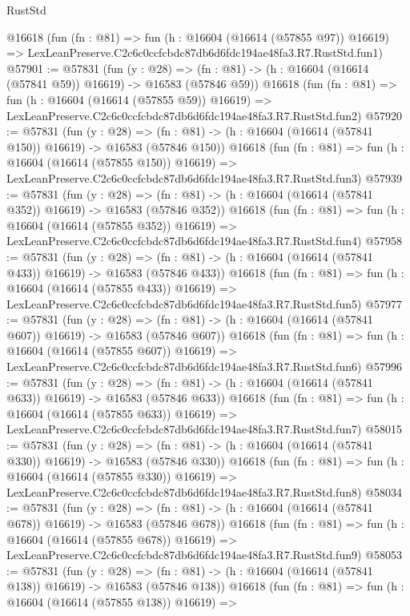 \begin{lexlean}{RustStd}
\begin{coremodule}
    @16618
    (fun (fn : @81) =>
    fun (h : @16604 (@16614 (@57855 @97)) @16619) =>
    LexLeanPreserve.C2c6c0ccfcbdc87db6d6fdc194ae48fa3.R7.RustStd.fun1)
@57901 := @57831
    (fun (y : @28) =>
    (fn : @81) -> (h : @16604 (@16614 (@57841 @59)) @16619) -> @16583 (@57846 @59))
    @16618
    (fun (fn : @81) =>
    fun (h : @16604 (@16614 (@57855 @59)) @16619) =>
    LexLeanPreserve.C2c6c0ccfcbdc87db6d6fdc194ae48fa3.R7.RustStd.fun2)
@57920 := @57831
    (fun (y : @28) =>
    (fn : @81) -> (h : @16604 (@16614 (@57841 @150)) @16619) -> @16583 (@57846 @150))
    @16618
    (fun (fn : @81) =>
    fun (h : @16604 (@16614 (@57855 @150)) @16619) =>
    LexLeanPreserve.C2c6c0ccfcbdc87db6d6fdc194ae48fa3.R7.RustStd.fun3)
@57939 := @57831
    (fun (y : @28) =>
    (fn : @81) -> (h : @16604 (@16614 (@57841 @352)) @16619) -> @16583 (@57846 @352))
    @16618
    (fun (fn : @81) =>
    fun (h : @16604 (@16614 (@57855 @352)) @16619) =>
    LexLeanPreserve.C2c6c0ccfcbdc87db6d6fdc194ae48fa3.R7.RustStd.fun4)
@57958 := @57831
    (fun (y : @28) =>
    (fn : @81) -> (h : @16604 (@16614 (@57841 @433)) @16619) -> @16583 (@57846 @433))
    @16618
    (fun (fn : @81) =>
    fun (h : @16604 (@16614 (@57855 @433)) @16619) =>
    LexLeanPreserve.C2c6c0ccfcbdc87db6d6fdc194ae48fa3.R7.RustStd.fun5)
@57977 := @57831
    (fun (y : @28) =>
    (fn : @81) -> (h : @16604 (@16614 (@57841 @607)) @16619) -> @16583 (@57846 @607))
    @16618
    (fun (fn : @81) =>
    fun (h : @16604 (@16614 (@57855 @607)) @16619) =>
    LexLeanPreserve.C2c6c0ccfcbdc87db6d6fdc194ae48fa3.R7.RustStd.fun6)
@57996 := @57831
    (fun (y : @28) =>
    (fn : @81) -> (h : @16604 (@16614 (@57841 @633)) @16619) -> @16583 (@57846 @633))
    @16618
    (fun (fn : @81) =>
    fun (h : @16604 (@16614 (@57855 @633)) @16619) =>
    LexLeanPreserve.C2c6c0ccfcbdc87db6d6fdc194ae48fa3.R7.RustStd.fun7)
@58015 := @57831
    (fun (y : @28) =>
    (fn : @81) -> (h : @16604 (@16614 (@57841 @330)) @16619) -> @16583 (@57846 @330))
    @16618
    (fun (fn : @81) =>
    fun (h : @16604 (@16614 (@57855 @330)) @16619) =>
    LexLeanPreserve.C2c6c0ccfcbdc87db6d6fdc194ae48fa3.R7.RustStd.fun8)
@58034 := @57831
    (fun (y : @28) =>
    (fn : @81) -> (h : @16604 (@16614 (@57841 @678)) @16619) -> @16583 (@57846 @678))
    @16618
    (fun (fn : @81) =>
    fun (h : @16604 (@16614 (@57855 @678)) @16619) =>
    LexLeanPreserve.C2c6c0ccfcbdc87db6d6fdc194ae48fa3.R7.RustStd.fun9)
@58053 := @57831
    (fun (y : @28) =>
    (fn : @81) -> (h : @16604 (@16614 (@57841 @138)) @16619) -> @16583 (@57846 @138))
    @16618
    (fun (fn : @81) =>
    fun (h : @16604 (@16614 (@57855 @138)) @16619) =>

\end{coremodule}
\end{lexlean}
